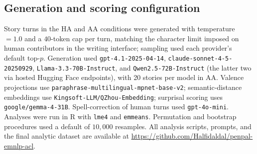\documentclass[11pt]{article}
\begin{document}
\subsection{Generation and scoring configuration}
Story turns in the HA and AA conditions were generated with temperature
$=1.0$ and a $40$-token cap per turn, matching the character limit imposed
on human contributors in the writing interface; sampling used each
provider's default top-$p$. Generation used
\texttt{gpt-4.1-2025-04-14}, \texttt{claude-sonnet-4-5-20250929},
\texttt{Llama-3.3-70B-Instruct}, and \texttt{Qwen2.5-72B-Instruct}
(the latter two via hosted Hugging Face endpoints), with 20 stories per
model in AA. Valence projections use
\texttt{paraphrase-multilingual-mpnet-base-v2}; semantic-distance embeddings use \texttt{Kingsoft-LLM/QZhou-Embedding}; surprisal scoring uses
\texttt{google/gemma-4-31B}. Spell-correction of human turns used
\texttt{gpt-4o-mini}. Analyses were run in R with \texttt{lme4} and
\texttt{emmeans}. Permutation and bootstrap procedures used a default of $10{,}000$ resamples. All analysis scripts, prompts, and the final analytic dataset are available at \url{https://github.com/Halfidaldal/penpal-emnlp-acl}.
\end{document}

